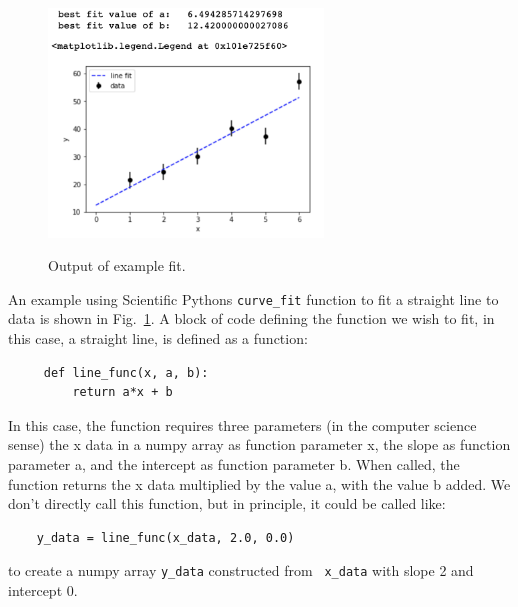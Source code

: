 \begin{figure}[htbp]
\begin{center}
\includegraphics[width=0.65\textwidth]{figs/fitting/fit_out.png} \\
\caption{Output of example fit.}
\label{fig:fiteg}
\end{center}
\end{figure}

An example using Scientific Pythons {\tt curve{\_}fit} function to fit
a straight line to data is shown in Fig.~\ref{fig:fiteg}.  A block of 
code defining the function we wish to fit, in this case, a straight
line, is defined as a function:
\begin{verbatim}
     def line_func(x, a, b):
         return a*x + b
\end{verbatim}
In this case, the function requires three parameters (in the computer
science sense) the x data in a numpy array as function parameter x,
the slope as function parameter a, and the intercept as function
parameter b.  When called, the function returns the x data multiplied
by the value a, with the value b added.  We don't directly call this
function, but in principle, it could be called like:
\begin{verbatim}
    y_data = line_func(x_data, 2.0, 0.0)
\end{verbatim}
to create a numpy array {\tt y{\_}data} constructed from {\tt
  x{\_}data} with slope 2 and intercept 0.

